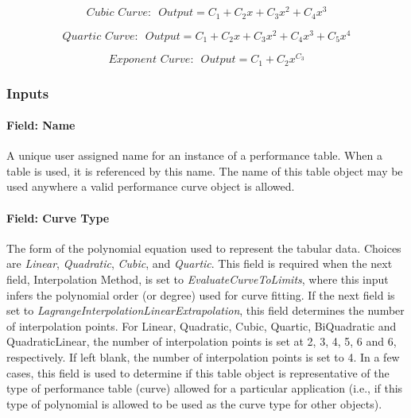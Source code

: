 \begin{equation}
Cubic\,\,Curve:\,\,\,Output = {C_1} + {C_2}x + {C_3}{x^2} + {C_4}{x^3}
\end{equation}

\begin{equation}
Quartic\,\,Curve:\,\,\,Output = {C_1} + {C_2}x + {C_3}{x^2} + {C_4}{x^3} + {C_5}{x^4}
\end{equation}

\begin{equation}
Exponent\,\,Curve:\,\,\,Output = {C_1} + {C_2}{x^{{C_3}}}
\end{equation}

\subsubsection{Inputs}\label{inputs-032}

\paragraph{Field: Name}\label{field-name-031}

A unique user assigned name for an instance of a performance table. When a table is used, it is referenced by this name. The name of this table object may be used anywhere a valid performance curve object is allowed.

\paragraph{Field: Curve Type}\label{field-curve-type}

The form of the polynomial equation used to represent the tabular data. Choices are \emph{Linear}, \emph{Quadratic}, \emph{Cubic}, and \emph{Quartic}. This field is required when the next field, Interpolation Method, is set to \emph{EvaluateCurveToLimits}, where this input infers the polynomial order (or degree) used for curve fitting. If the next field is set to \emph{LagrangeInterpolationLinearExtrapolation}, this field determines the number of interpolation points. For Linear, Quadratic, Cubic, Quartic, BiQuadratic and QuadraticLinear, the number of interpolation points is set at 2, 3, 4, 5, 6 and 6, respectively. If left blank, the number of interpolation points is set to 4. In a few cases, this field is used to determine if this table object is representative of the type of performance table (curve) allowed for a particular application (i.e., if this type of polynomial is allowed to be used as the curve type for other objects).

